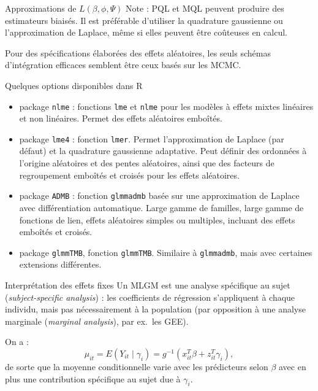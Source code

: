 \documentclass{BeamerTemplate}
\begin{document}
\begin{refsection}
\begin{frame}{Approximations de $L(\beta,\phi, \Psi)$}
\bigskip
Note : PQL et MQL peuvent produire des estimateurs biaisés. Il est préférable d'utiliser la
quadrature gaussienne ou l'approximation de Laplace, même si elles peuvent être coûteuses
en calcul.

\bigskip
Pour des spécifications élaborées des effets aléatoires, les seuls schémas
d'intégration efficaces semblent être ceux basés sur les MCMC.

\end{frame}

\begin{frame}{Quelques options disponibles dans R}

\begin{itemize}
\item package \texttt{nlme} : fonctions \texttt{lme} et \texttt{nlme}
  pour les modèles à effets mixtes linéaires et non linéaires. Permet des effets
  aléatoires emboîtés.
\item package \texttt{lme4} : fonction \texttt{lmer}. Permet l'approximation de Laplace (par défaut) et la
quadrature gaussienne adaptative. Peut définir des ordonnées à l'origine
aléatoires et des pentes aléatoires, ainsi que des facteurs de regroupement
emboîtés et croisés pour les effets aléatoires.
\item package \texttt{ADMB} : fonction \texttt{glmmadmb} basée sur une approximation
de Laplace avec différentiation automatique. Large gamme de familles,
large gamme de fonctions de lien, effets aléatoires simples ou multiples, incluant
des effets emboîtés et croisés.
\item package \texttt{glmmTMB}, fonction \texttt{glmmTMB}. Similaire à \texttt{glmmadmb}, mais avec certaines extensions différentes.
\end{itemize}

\end{frame}


\begin{frame}{Interprétation des effets fixes}
Un MLGM est une {\color{blue}analyse spécifique au sujet} (\textit{subject-specific analysis}) : les coefficients
de régression s'appliquent à chaque individu, mais pas nécessairement à la population (par
opposition à une {\color{blue}analyse marginale} (\textit{marginal analysis}), par ex.\ les GEE).

\bigskip
On a :
$$\mu_{it} = E(Y_{it}\mid \gamma_i) = g^{-1}(x_{it}^T \beta + z_{it}^T \gamma_i),$$
de sorte que la moyenne conditionnelle varie avec les prédicteurs selon
$\beta$ avec en plus une contribution spécifique au sujet due à $\gamma_i$.


\end{frame}
\end{refsection}
\end{document}

